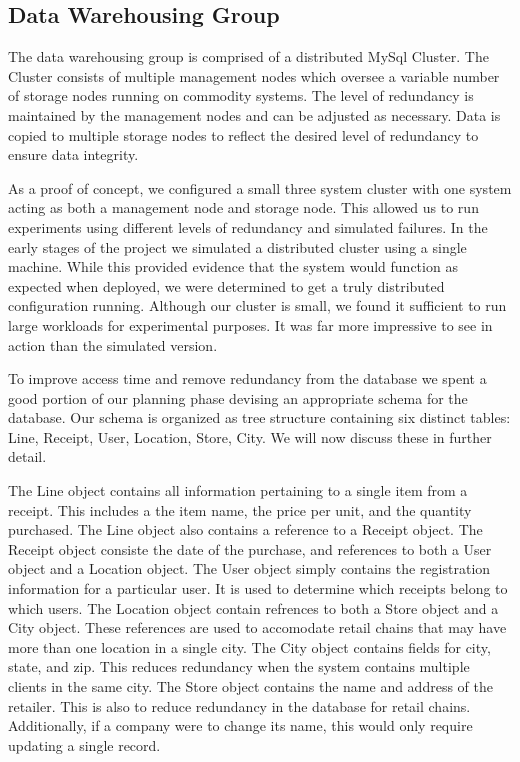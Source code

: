 \subsection{Data Warehousing Group}
\label{sec:implementation.db}

The data warehousing group is comprised of a distributed MySql Cluster.  The Cluster consists of multiple management nodes which oversee a variable number of storage nodes running on commodity systems.  The level of redundancy is maintained by the management nodes and can be adjusted as necessary.  Data is copied to multiple storage nodes to reflect the desired level of redundancy to ensure data integrity.

As a proof of concept, we configured a small three system cluster with one system acting as both a management node and storage node.  This allowed us to run experiments using different levels of redundancy and simulated failures.  In the early stages of the project we simulated a distributed cluster using a single machine.  While this provided evidence that the system would function as expected when deployed, we were determined to get a truly distributed configuration running.  Although our cluster is small, we found it sufficient to run large workloads for experimental purposes.  It was far more impressive to see in action than the simulated version.

To improve access time and remove redundancy from the database we spent a good portion of our planning phase devising an appropriate schema for the database.  Our schema is organized as tree structure containing six distinct tables: Line, Receipt, User, Location, Store, City.  We will now discuss these in further detail.

The Line object contains all information pertaining to a single item from a receipt.  This includes a the item name, the price per unit, and the quantity purchased.  The Line object also contains a reference to a Receipt object.  The Receipt object consiste the date of the purchase, and references to both a User object and a Location object.  The User object simply contains the registration information for a particular user.  It is used to determine which receipts belong to which users.  The Location object contain refrences to both a Store object and a City object.  These references are used to accomodate retail chains that may have more than one location in a single city.  The City object contains fields for city, state, and zip.  This reduces redundancy when the system contains multiple clients in the same city.  The Store object contains the name and address of the retailer.  This is also to reduce redundancy in the database for retail chains.  Additionally, if a company were to change its name, this would only require updating a single record.
